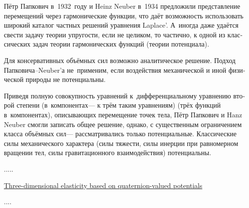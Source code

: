 {
\begin{otherlanguage}{russian}
\fontsize{8}{9}\selectfont

Пётр Папкович в~1932~году и Heinz Neuber в~1934 предложили представление перемещений через гармонические функции, что даёт возможность использовать широкий каталог частных решений уравнения Laplace’.
А~иногда даже удаётся свести задачу теории упругости, если не целиком, то частично, к одной из классических задач теории гармонических функций (теории потенциала).

Для консервативных объёмных сил возможно аналитическое решение.
Подход Папковича\hbox{--}Neuber’а не~применим, если воздействия механической и иной физической природы не потенциальны.

Приведя полную совокупность уравнений
к~дифференциальному уравнению второй степени
(в~компонентах\:--- к трём таким уравнениям)
(трёх функций в~компонентах),
описывающих перемещение точек тела,
Пётр Папкович и Hanz Neuber смогли записать общее решение,
однако,
с существенным ограничением класса объёмных сил\:---
рассматривались только потенциальные.
Классические силы механического характера
(силы тяжести, силы инерции при равномерном вращении тел, силы гравитационного взаимодействия)
потенциальны.

\end{otherlanguage}
}

.....

\href{https://www.sciencedirect.com/science/article/pii/S0020768314002340}{Three\hbox{-}dimensional elasticity based on quaternion\hbox{-}valued potentials}

....
